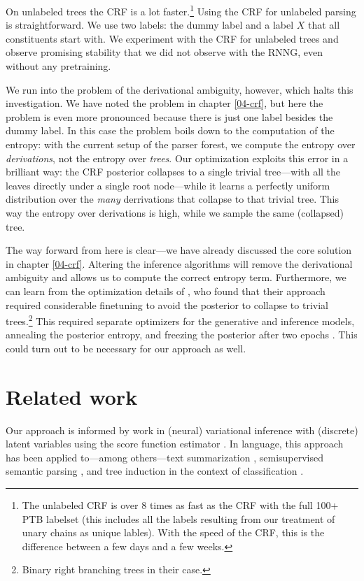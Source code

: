     On unlabeled trees the CRF is a lot faster.\footnote{The unlabeled CRF is over 8 times as fast as the CRF with the full 100+ PTB labelset (this includes all the labels resulting from our treatment of unary chains as unique lables). With the speed of the CRF, this is the difference between a few days and a few weeks.} Using the CRF for unlabeled parsing is straightforward. We use two labels: the dummy label and a label $X$ that all constituents start with. We experiment with the CRF for unlabeled trees and observe promising stability that we did not observe with the RNNG, even without any pretraining.

    We run into the problem of the derivational ambiguity, however, which halts this investigation. We have noted the problem in chapter \ref{04-crf}, but here the problem is even more pronounced because there is just one label besides the dummy label. In this case the problem boils down to the computation of the entropy: with the current setup of the parser forest, we compute the entropy over \textit{derivations}, not the entropy over \textit{trees}. Our optimization exploits this error in a brilliant way: the CRF posterior collapses to a single trivial tree---with all the leaves directly under a single root node---while it learns a perfectly uniform distribution over the \textit{many} derrivations that collapse to that trivial tree. This way the entropy over derivations is high, while we sample the same (collapsed) tree.

    The way forward from here is clear---we have already discussed the core solution in chapter \ref{04-crf}. Altering the inference algorithms will remove the derivational ambiguity and allows us to compute the correct entropy term. Furthermore, we can learn from the optimization details of \citet{kim2019unsupervised}, who found that their approach required considerable finetuning to avoid the posterior to collapse to trivial trees.\footnote{Binary right branching trees in their case.} This required separate optimizers for the generative and inference models, annealing the posterior entropy, and freezing the posterior after two epochs \citep{kim2019unsupervised}. This could turn out to be necessary for our approach as well.

\section{Related work}
  Our approach is informed by work in (neural) variational inference with (discrete) latent variables using the score function estimator \citep{paisley2012viss,mnih2014nvil,ranganath2014black,mnih2016variational}. In language, this approach has been applied to---among others---text summarization \citep{miao2016discrete}, semisupervised semantic parsing \citep{yin2018structvae}, and tree induction in the context of classification \citep{yogatama2016reinforcement}.

